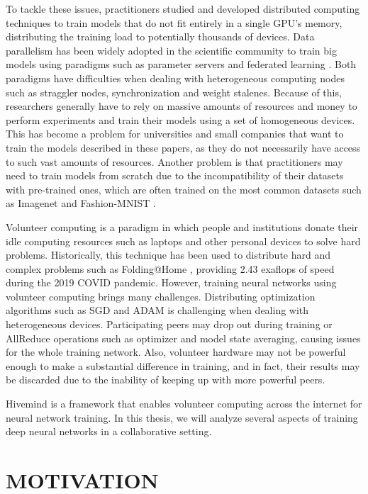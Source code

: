 To tackle these issues, practitioners studied and developed distributed computing techniques to train models that do not fit entirely in a single GPU's memory, distributing the training load to potentially thousands of devices.
Data parallelism has been widely adopted in the scientific community to train big models using paradigms such as parameter servers \cite{NIPS20141ff1de77, 10.5555/2685048.2685095} and federated learning \cite{DBLP:journals/corr/abs-1907-09693}.
Both paradigms have difficulties when dealing with heterogeneous computing nodes such as straggler nodes, synchronization and weight stalenes.
Because of this, researchers generally have to rely on massive amounts of resources and money to perform experiments and train their models using a set of homogeneous devices.
This has become a problem for universities and small companies that want to train the models described in these papers, as they do not necessarily have access to such vast amounts of resources.
Another problem is that practitioners may need to train models from scratch due to the incompatibility of their datasets with pre-trained ones, which are often trained on the most common datasets such as Imagenet \cite{deng2009imagenet} and Fashion-MNIST \cite{DBLP:journals/corr/abs-1708-07747}.

Volunteer computing is a paradigm in which people and institutions donate their idle computing resources such as laptops and other personal devices to solve hard problems.
Historically, this technique has been used to distribute hard and complex problems such as Folding@Home \cite{10.1109/IPDPS.2009.5160922}, providing 2.43 exaflops of speed during the 2019 COVID pandemic.
However, training neural networks using volunteer computing brings many challenges.
Distributing optimization algorithms such as SGD and ADAM is challenging when dealing with heterogeneous devices.
Participating peers may drop out during training or AllReduce operations such as optimizer and model state averaging, causing issues for the whole training network.
Also, volunteer hardware may not be powerful enough to make a substantial difference in training, and in fact, their results may be discarded due to the inability of keeping up with more powerful peers.

Hivemind \cite{riabinin2020hivemind} is a framework that enables volunteer computing across the internet for neural network training.
In this thesis, we will analyze several aspects of training deep neural networks in a collaborative setting.

\section{MOTIVATION}

